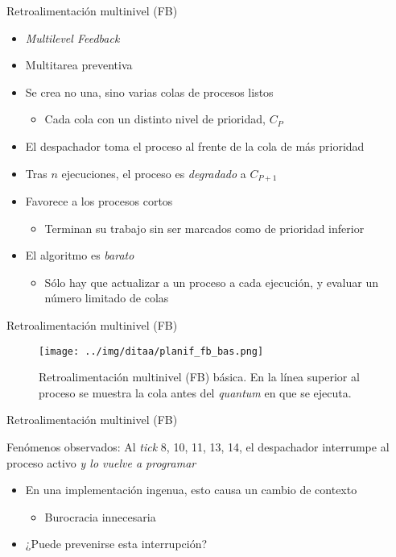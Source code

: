 \documentclass[presentation]{beamer}
\begin{document}
\begin{frame}[label={sec:org80cbbae}]{Retroalimentación multinivel (FB)}
\begin{itemize}
\item \emph{Multilevel Feedback}
\item Multitarea preventiva
\item Se crea no una, sino varias colas de procesos listos
\begin{itemize}
\item Cada cola con un distinto nivel de prioridad, \(C_P\)
\end{itemize}
\item El despachador toma el proceso al frente de la cola de más
prioridad
\item Tras \(n\) ejecuciones, el proceso es \emph{degradado} a \(C_{P+1}\)
\item Favorece a los procesos cortos
\begin{itemize}
\item Terminan su trabajo sin ser marcados como de prioridad inferior
\end{itemize}
\item El algoritmo es \emph{barato}
\begin{itemize}
\item Sólo hay que actualizar a un proceso a cada ejecución, y evaluar un
número limitado de colas
\end{itemize}
\end{itemize}
\end{frame}

\begin{frame}[label={sec:orgb131b76}]{Retroalimentación multinivel (FB)}
\begin{figure}[htbp]
\centering
\texttt{[image: ../img/ditaa/planif\_fb\_bas.png]}
\caption{Retroalimentación multinivel (FB) básica. En la línea superior al proceso se muestra la cola antes del \emph{quantum} en que se ejecuta.}
\end{figure}
\end{frame}

\begin{frame}[label={sec:org3807365}]{Retroalimentación multinivel (FB)}
\begin{center}
Fenómenos observados:
\vfill
Al \emph{tick} 8, 10, 11, 13, 14, el despachador interrumpe al proceso
activo \emph{y lo vuelve a programar}
\end{center}
\begin{itemize}
\item En una implementación ingenua, esto causa un cambio de contexto
\begin{itemize}
\item Burocracia innecesaria
\end{itemize}
\item ¿Puede prevenirse esta interrupción?
\end{itemize}
\end{frame}
\end{document}
